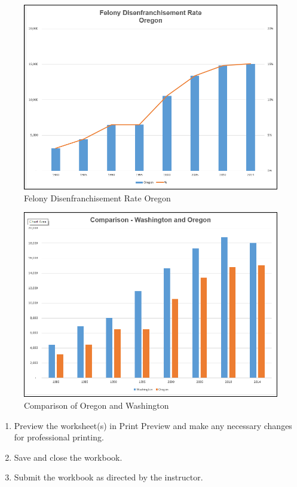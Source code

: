 \begin{figure}[H]
	\centering
	\includegraphics[width=\maxwidth{.95\linewidth}]{gfx/ch04_fig58}
	\caption{Felony Disenfranchisement Rate Oregon}
	\label{04:fig58}
\end{figure}

\begin{figure}[H]
	\centering
	\includegraphics[width=\maxwidth{.95\linewidth}]{gfx/ch04_fig59}
	\caption{Comparison of Oregon and Washington}
	\label{04:fig59}
\end{figure}

\begin{enumbox}
	\begin{enumerate}
		\item Preview the worksheet(s) in Print Preview and make any necessary changes for professional printing.
		\item Save and close the  workbook. 
		\item Submit the  workbook as directed by the instructor.
	\end{enumerate}
\end{enumbox}